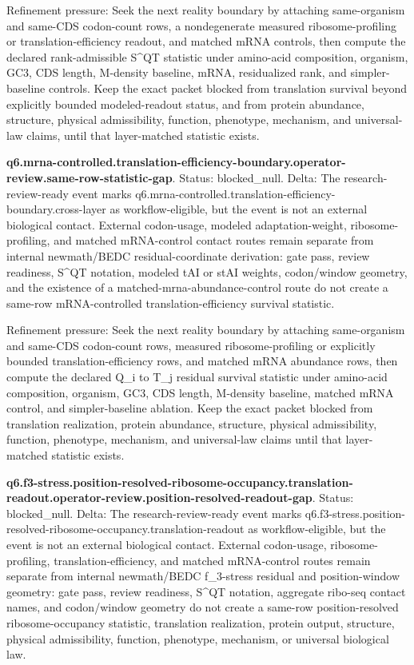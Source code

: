 Refinement pressure: Seek the next reality boundary by attaching same-organism and same-CDS codon-count rows, a nondegenerate measured ribosome-profiling or translation-efficiency readout, and matched mRNA controls, then compute the declared rank-admissible S\textasciicircum{}QT statistic under amino-acid composition, organism, GC3, CDS length, M-density baseline, mRNA, residualized rank, and simpler-baseline controls. Keep the exact packet blocked from translation survival beyond explicitly bounded modeled-readout status, and from protein abundance, structure, physical admissibility, function, phenotype, mechanism, and universal-law claims, until that layer-matched statistic exists.

\textbf{q6.mrna-controlled.translation-efficiency-boundary.operator-review.same-row-statistic-gap}. Status: blocked\_null. Delta: The research-review-ready event marks q6.mrna-controlled.translation-efficiency-boundary.cross-layer as workflow-eligible, but the event is not an external biological contact. External codon-usage, modeled adaptation-weight, ribosome-profiling, and matched mRNA-control contact routes remain separate from internal newmath/BEDC residual-coordinate derivation: gate pass, review readiness, S\textasciicircum{}QT notation, modeled tAI or stAI weights, codon/window geometry, and the existence of a matched-mrna-abundance-control route do not create a same-row mRNA-controlled translation-efficiency survival statistic.

Refinement pressure: Seek the next reality boundary by attaching same-organism and same-CDS codon-count rows, measured ribosome-profiling or explicitly bounded translation-efficiency rows, and matched mRNA abundance rows, then compute the declared Q\_i to T\_j residual survival statistic under amino-acid composition, organism, GC3, CDS length, M-density baseline, matched mRNA control, and simpler-baseline ablation. Keep the exact packet blocked from translation realization, protein abundance, structure, physical admissibility, function, phenotype, mechanism, and universal-law claims until that layer-matched statistic exists.

\textbf{q6.f3-stress.position-resolved-ribosome-occupancy.translation-readout.operator-review.position-resolved-readout-gap}. Status: blocked\_null. Delta: The research-review-ready event marks q6.f3-stress.position-resolved-ribosome-occupancy.translation-readout as workflow-eligible, but the event is not an external biological contact. External codon-usage, ribosome-profiling, translation-efficiency, and matched mRNA-control routes remain separate from internal newmath/BEDC f\_3-stress residual and position-window geometry: gate pass, review readiness, S\textasciicircum{}QT notation, aggregate ribo-seq contact names, and codon/window geometry do not create a same-row position-resolved ribosome-occupancy statistic, translation realization, protein output, structure, physical admissibility, function, phenotype, mechanism, or universal biological law.

